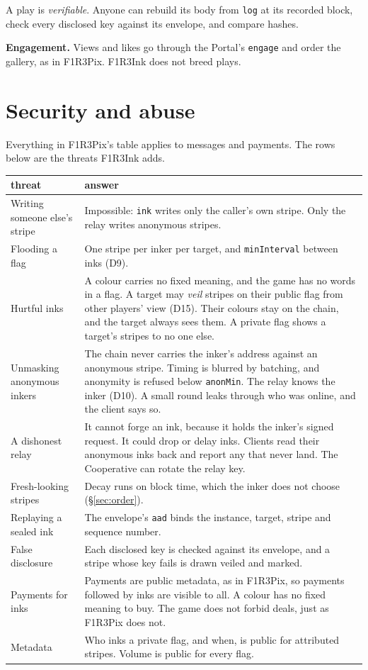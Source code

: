 \documentclass[11pt,a4paper]{article}
\newcommand{\code}[1]{\texttt{#1}}
\newcounter{req}
\begin{document}
A play is \emph{verifiable}. Anyone can rebuild its body from \code{log} at its recorded block,
check every disclosed key against its envelope, and compare hashes.

\textbf{Engagement.} Views and likes go through the Portal's \code{engage} and order the gallery,
as in F1R3Pix. F1R3Ink does not breed plays.

\section{Security and abuse}\label{sec:security}

Everything in F1R3Pix's table applies to messages and payments. The rows below are the threats
F1R3Ink adds.

\begin{center}\small
\begin{tabularx}{\linewidth}{@{}>{\raggedright\arraybackslash}p{40mm} X@{}}
\toprule
threat & answer\\
\midrule
Writing someone else's stripe & Impossible: \code{ink} writes only the caller's own stripe. Only the relay writes anonymous stripes.\\
Flooding a flag & One stripe per inker per target, and \code{minInterval} between inks (D9).\\
Hurtful inks & A colour carries no fixed meaning, and the game has no words in a flag. A target may \emph{veil} stripes on their public flag from other players' view (D15). Their colours stay on the chain, and the target always sees them. A private flag shows a target's stripes to no one else.\\
Unmasking anonymous inkers & The chain never carries the inker's address against an anonymous stripe. Timing is blurred by batching, and anonymity is refused below \code{anonMin}. The relay knows the inker (D10). A small round leaks through who was online, and the client says so.\\
A dishonest relay & It cannot forge an ink, because it holds the inker's signed request. It could drop or delay inks. Clients read their anonymous inks back and report any that never land. The Cooperative can rotate the relay key.\\
Fresh-looking stripes & Decay runs on block time, which the inker does not choose (\S\ref{sec:order}).\\
Replaying a sealed ink & The envelope's \code{aad} binds the instance, target, stripe and sequence number.\\
False disclosure & Each disclosed key is checked against its envelope, and a stripe whose key fails is drawn veiled and marked.\\
Payments for inks & Payments are public metadata, as in F1R3Pix, so payments followed by inks are visible to all. A colour has no fixed meaning to buy. The game does not forbid deals, just as F1R3Pix does not.\\
Metadata & Who inks a private flag, and when, is public for attributed stripes. Volume is public for every flag.\\
\bottomrule
\end{tabularx}
\end{center}
\end{document}
